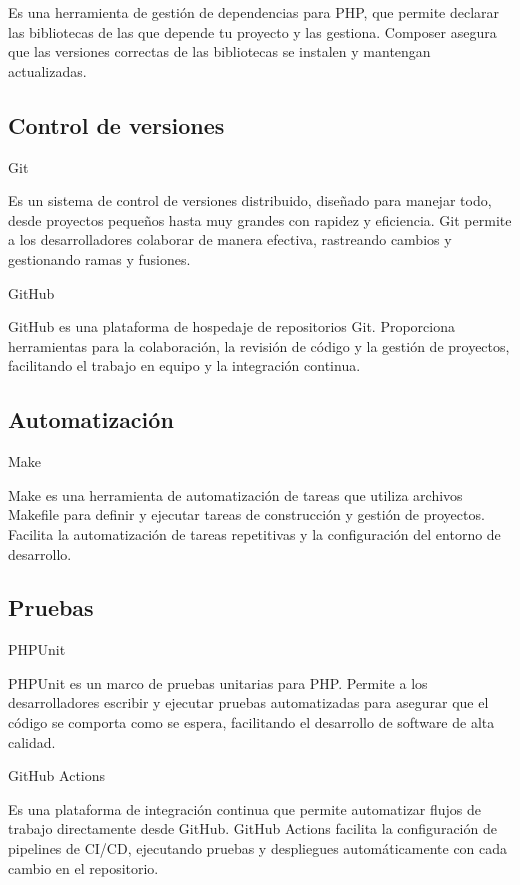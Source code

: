 Es una herramienta de gestión de dependencias para PHP, que
permite declarar las bibliotecas de las que depende tu proyecto
y las gestiona.
Composer asegura que las versiones correctas de las bibliotecas se instalen y mantengan actualizadas.

\subsection*{Control de versiones}

Git

Es un sistema de control de versiones distribuido, diseñado para manejar todo, desde proyectos
pequeños hasta muy grandes con rapidez y eficiencia.
Git permite a los desarrolladores colaborar de manera efectiva, rastreando cambios y gestionando ramas y fusiones.


GitHub

GitHub es una plataforma de hospedaje de repositorios Git.
Proporciona herramientas para la colaboración, la revisión de código y la gestión de proyectos, facilitando el trabajo
en equipo y la integración continua.

\subsection*{Automatización}

Make

Make es una herramienta de automatización de tareas que utiliza archivos Makefile para definir y ejecutar tareas de
construcción y gestión de proyectos.
Facilita la automatización de tareas repetitivas y la configuración del entorno de desarrollo.

\subsection*{Pruebas}

PHPUnit

PHPUnit es un marco de pruebas unitarias para PHP. Permite a los desarrolladores escribir y ejecutar pruebas
automatizadas
para asegurar que el código se comporta como se espera, facilitando el desarrollo de software de alta calidad.

GitHub Actions

Es una plataforma de integración continua que permite automatizar flujos de trabajo directamente desde GitHub.
GitHub Actions facilita la configuración de pipelines de CI/CD, ejecutando pruebas y despliegues automáticamente con
cada cambio en el repositorio.

